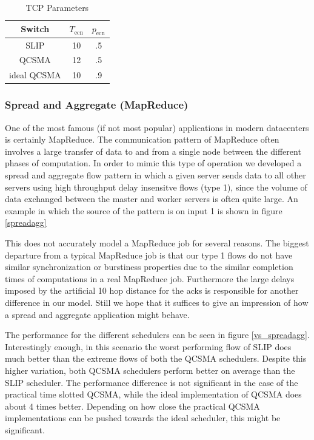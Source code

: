 \documentclass[11pt]{article}%
\begin{document}
\begin{table}[ht] \caption{TCP Parameters} 
\centering
\begin{tabular}{c c c}
 \hline\hline 
 Switch & $T_{\text{ecn}}$ & $p_{\text{ecn}}$ \\
  [0.5ex] \hline 
 SLIP&10&.5 \\
  QCSMA&12&.5  \\
   ideal  QCSMA&10&.9  \\
  [1.0ex] \hline 
  \end{tabular}
   \label{ecn_table} 
\end{table}


\subsubsection{Spread and Aggregate (MapReduce)}
One of the most famous (if not most popular) applications in modern datacenters is certainly MapReduce.  The communication pattern of MapReduce often involves a large transfer of data to and from a single node between the different phases of computation.  In order to mimic this type of operation we developed a spread and aggregate flow pattern in which a given server sends data to all other servers using high throughput delay insensitve flows (type 1), since the volume of data exchanged between the master and worker servers is often quite large.  An example in which the source of the pattern is on input 1 is shown in figure \ref{spreadagg}

This does not accurately model a MapReduce job for several reasons.  The biggest departure from a typical MapReduce job is that our type 1 flows do not have similar synchronization or burstiness properties due to the similar completion times of computations in a real MapReduce job.  Furthermore the large delays imposed by the artificial 10 hop distance for the acks is responsible for another difference in our model.  Still we hope that it suffices to give an impression of how a spread and aggregate application might behave.

The performance for the different schedulers can be seen in figure \ref{vs_spreadagg}.  Interestingly enough, in this scenario the worst performing flow of SLIP does much better than the extreme flows of both the QCSMA schedulers.  Despite this higher variation, both QCSMA schedulers perform better on average than the SLIP scheduler.  The performance difference is not significant in the case of the practical time slotted QCSMA, while the ideal implementation of QCSMA does about 4 times better.  Depending on how close the practical QCSMA implementations can be pushed towards the ideal scheduler, this might be significant.
\end{document}

